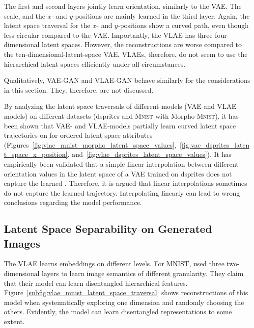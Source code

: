The first and second layers jointly learn orientation, similarly to the \ac{VAE}.
The scale, and the $x$- and $y$-positions are mainly learned in the third layer.
Again, the latent space traversal for the $x$- and $y$-positions show a curved path, even though less circular compared to the \ac{VAE}.
Importantly, the \ac{VLAE} has three four-dimensional latent spaces.
However, the reconstructions are worse compared to the ten-dimensional-latent-space \ac{VAE}.
\acp{VLAE}, therefore, do not seem to use the hierarchical latent spaces efficiently under all circumstances.

Qualitatively, \ac{VAE}-\ac{GAN} and \ac{VLAE}-\ac{GAN} behave similarly for the considerations in this section.
They, therefore, are not discussed.

By analyzing the latent space traversals of different models (\ac{VAE} and \ac{VLAE} models) on different datasets (dsprites and \textsc{Mnist} with Morpho-\textsc{Mnist}), it has been shown that \ac{VAE}- and \ac{VLAE}-models partially learn curved latent space trajectories on for ordered latent space attributes (Figures~\ref{fig:vlae_mnist_morpho_latent_space_values},~\ref{fig:vae_dsprites_latent_space_x_position}, and~\ref{fig:vlae_dsprites_latent_space_values}).
It has empirically been validated that a simple linear interpolation between different orientation values in the latent space of a \ac{VAE} trained on dsprites does not capture the learned .
Therefore, it is argued that linear interpolations sometimes do not capture the learned trajectory.
Interpolating linearly can lead to wrong conclusions regarding the model performance.


\subsection{Latent Space Separability on Generated Images}\label{subsec:independence-of-vlae-embeddings}

The VLAE learns embeddings on different levels.
For MNIST, \citet{zhao2017learning} used three two-dimensional layers to learn image semantics of different granularity.
They claim that their model can learn disentangled hierarchical features.
Figure~\ref{subfig:vlae_mnist_latent_space_traversal} shows reconstructions of this model when systematically exploring one dimension and randomly choosing the others.
Evidently, the model can learn disentangled representations to some extent.

